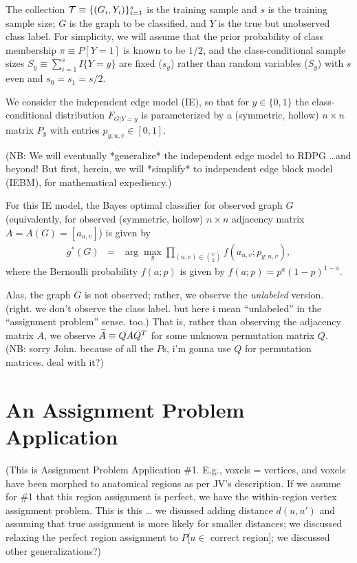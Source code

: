 The collection
$\mathcal{T} \equiv \{(G_i,Y_i)\}_{i=1}^s$ is the training sample
and $s$ is the training sample size;
$G$ is the graph to be classified,
and $Y$ is the true but unobserved class label.
For simplicity, we will assume that the prior probability of class membership
$\pi \equiv P[Y=1]$ is known to be $1/2$,
and the class-conditional sample sizes $S_y \equiv \sum_{i=1}^s I\{Y=y\}$
are fixed ($s_y$) rather than random variables ($S_y$)
with $s$ even and $s_0=s_1=s/2$.

We consider the independent edge model (IE),
so that for $y \in \{0,1\}$ the class-conditional distribution $F_{G|Y=y}$
is parameterized by a (symmetric, hollow)
$n \times n$ matrix $P_y$ with entries $p_{y;u,v} \in [0,1]$.

(NB: We will eventually *generalize* the independent edge model to RDPG \ldots and beyond!
But first, herein, we will *simplify* to independent edge block model (IEBM), for mathematical expediency.)

For this IE model, the Bayes optimal classifier for observed graph $G$
(equivalently, for observed (symmetric, hollow) $n \times n$ adjacency matrix $A=A(G)=[a_{u,v}]$)
is given by
\begin{eqnarray}
g^*(G) &=& \arg\max_y \prod_{(u,v) \in {V \choose 2}} f(a_{u,v};p_{y;u,v}),
\end{eqnarray}
where the Bernoulli probability $f(a;p)$ is given by
$f(a;p) = p^{a} (1-p)^{1-a}$.

Alas, the graph $G$ is not observed;
rather, we observe the {\em unlabeled} version.
(right. we don't observe the class label.
but here i mean ``unlabeled'' in the ``assignment problem'' sense.
too.)
That is, rather than observing the adjacency matrix $A$,
we observe $\widetilde{A} \equiv QAQ^T$ for some unknown permutation matrix $Q$.
\\
(NB: sorry John.  because of all the $P$s, i'm gonna use $Q$ for permutation matrices.  deal with it?)




\section{An Assignment Problem Application}


(This is Assignment Problem Application \#1.
E.g., voxels = vertices,
and voxels have been morphed to anatomical regions as per JV's description.
If we assume for \#1 that this region assignment is perfect,
we have the within-region vertex assignment problem.
This is this \dots
we disussed adding distance $d(u,u')$ and assuming that true assignment is more likely for smaller distances;
we discussed relaxing the perfect region assignment to $P[u \in$ correct region$]$;
we discussed other generalizations?)


